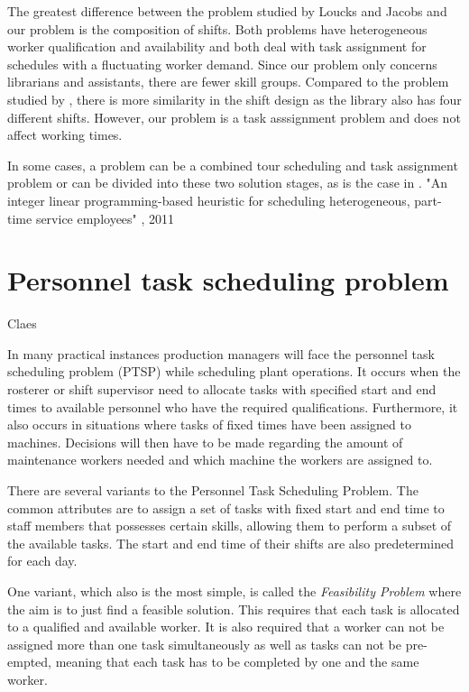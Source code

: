 The greatest difference between the problem studied by Loucks and Jacobs and our problem is the composition of shifts. Both problems have heterogeneous worker qualification and availability and both deal with task assignment for schedules with a fluctuating worker demand. Since our problem only concerns librarians and assistants, there are fewer skill groups. Compared to the problem studied by \cite{choi_hwang_park_2009}, there is more similarity in the shift design as the library also has four different shifts. However, our problem is a task asssignment problem and does not affect working times. 

In some cases, a problem can be a combined tour scheduling and task assignment problem or can be divided into these two solution stages, as is the case in \cite{keylist}. "An integer linear programming-based heuristic for scheduling heterogeneous, part-time service employees" , 2011


\section{Personnel task scheduling problem} \label{PTSP}
Claes

In many practical instances production managers will face the personnel task scheduling problem (PTSP) while scheduling plant operations. It occurs when the rosterer or shift supervisor need to allocate tasks with specified start and end times to available personnel who have the required qualifications. Furthermore, it also occurs in situations where tasks of fixed times have been assigned to machines. Decisions will then have to be made regarding the amount of maintenance workers needed and which machine the workers are assigned to.

There are several variants to the Personnel Task Scheduling Problem. The common attributes are to assign a set of tasks with fixed start and end time to staff members that possesses certain skills, allowing them to perform a subset of the available tasks. The start and end time of their shifts are also predetermined for each day.

One variant, which also is the most simple, is called the \textit{Feasibility Problem} where the aim is to just find a feasible solution. This requires that each task is allocated to a qualified and available worker. It is also required that a worker can not be assigned more than one task simultaneously as well as tasks can not be pre-empted, meaning that each task has to be completed by one and the same worker.

